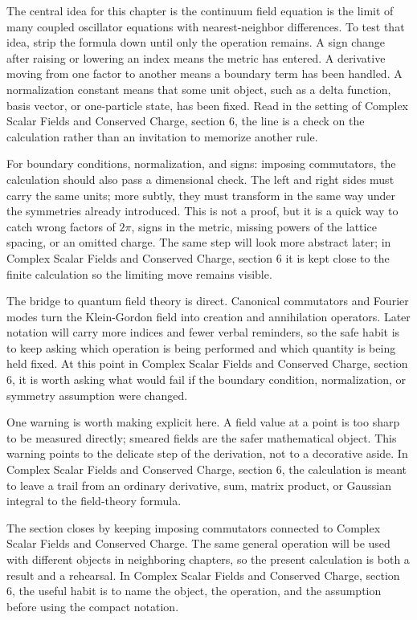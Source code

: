 The central idea for this chapter is the continuum field equation is the limit of many coupled oscillator equations with nearest-neighbor differences.  To test that idea, strip the formula down until only the operation remains.  A sign change after raising or lowering an index means the metric has entered.  A derivative moving from one factor to another means a boundary term has been handled.  A normalization constant means that some unit object, such as a delta function, basis vector, or one-particle state, has been fixed.  Read in the setting of Complex Scalar Fields and Conserved Charge, section 6, the line is a check on the calculation rather than an invitation to memorize another rule.

For boundary conditions, normalization, and signs: imposing commutators, the calculation should also pass a dimensional check.  The left and right sides must carry the same units; more subtly, they must transform in the same way under the symmetries already introduced.  This is not a proof, but it is a quick way to catch wrong factors of \(2\pi\), signs in the metric, missing powers of the lattice spacing, or an omitted charge.  The same step will look more abstract later; in Complex Scalar Fields and Conserved Charge, section 6 it is kept close to the finite calculation so the limiting move remains visible.

The bridge to quantum field theory is direct.  Canonical commutators and Fourier modes turn the Klein-Gordon field into creation and annihilation operators.  Later notation will carry more indices and fewer verbal reminders, so the safe habit is to keep asking which operation is being performed and which quantity is being held fixed.  At this point in Complex Scalar Fields and Conserved Charge, section 6, it is worth asking what would fail if the boundary condition, normalization, or symmetry assumption were changed.

One warning is worth making explicit here.  A field value at a point is too sharp to be measured directly; smeared fields are the safer mathematical object.  This warning points to the delicate step of the derivation, not to a decorative aside.  In Complex Scalar Fields and Conserved Charge, section 6, the calculation is meant to leave a trail from an ordinary derivative, sum, matrix product, or Gaussian integral to the field-theory formula.

The section closes by keeping imposing commutators connected to Complex Scalar Fields and Conserved Charge.  The same general operation will be used with different objects in neighboring chapters, so the present calculation is both a result and a rehearsal.  In Complex Scalar Fields and Conserved Charge, section 6, the useful habit is to name the object, the operation, and the assumption before using the compact notation.



